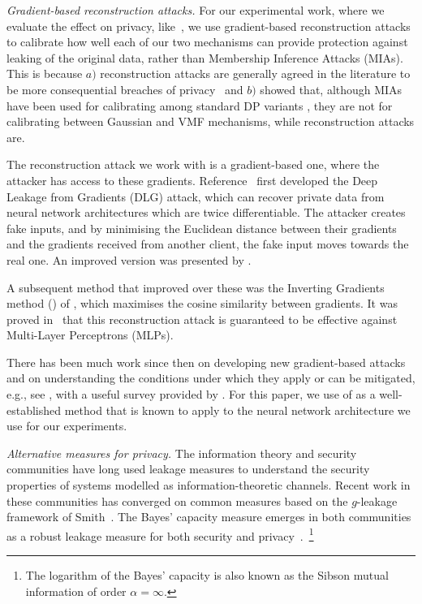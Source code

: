 \emph{Gradient-based reconstruction attacks.} For our experimental work, where we evaluate the effect on privacy, like~\cite{faustini2023directional}, we use gradient-based reconstruction attacks to calibrate how well each of our two mechanisms can provide protection against leaking of the original data, rather than Membership Inference Attacks (MIAs). This is because $a)$ reconstruction attacks are generally agreed in the literature to be more consequential breaches of privacy~\citep{melis-etal:2019:IEEE-SP, balle-etal:2022:IEEE-SP} and $b)$ \citep{faustini2023directional} showed that, although MIAs have been used for calibrating among standard DP variants \citep{DBLP:conf/uss/Jayaraman019}, they are not for calibrating between Gaussian and VMF mechanisms, while reconstruction attacks are.

The reconstruction attack we work with is a gradient-based one, where the attacker has access to these gradients.  
    Reference~\citet{zhu-etal:2019:NeurIPS} first developed the Deep Leakage from Gradients (DLG) attack, which can recover private data from neural network architectures which are twice differentiable. The attacker creates fake inputs, and by minimising the Euclidean distance between their gradients and the gradients received from another client, the fake input moves towards the real one.  An improved version was presented by \citet{DBLP:journals/corr/abs-2001-02610}.
    
    A subsequent method that improved over these was the Inverting Gradients method (\IGA) of \citet{geiping-etal:2020:NeurIPS}, which maximises the cosine similarity between gradients. It was proved in~\citet{geiping-etal:2020:NeurIPS}  that this reconstruction attack is guaranteed to be effective against Multi-Layer Perceptrons (MLPs). 
    
There has been much work since then on developing new gradient-based attacks and on understanding the conditions under which they apply or can be mitigated, e.g., see \citep{huang-etal:2021:NeurIPS,wu-etal:2023:UAI:learning-invert,wang-etal:2023:AISTATS:reconstructing-provably}, with a useful survey provided by \citet{du2024sok}.
For this paper, we use \IGA of \citet{geiping-etal:2020:NeurIPS} as a well-established method that is known to apply to the neural network architecture we use for our experiments.

\emph{Alternative measures for privacy.} The information theory and security communities have long used leakage measures to understand the security properties of systems modelled as information-theoretic channels. Recent work in these communities has converged on common measures based on the $g$-leakage framework of Smith~\cite{Smith09,issa2019operational}. The Bayes' capacity measure emerges in both communities as a robust leakage measure for both security and privacy~\cite{Alvim20:Book,sibson1969information,issa2019operational}.~\footnote{The logarithm of the Bayes' capacity is also known as the Sibson mutual information of order $\alpha = \infty$.} 
 
